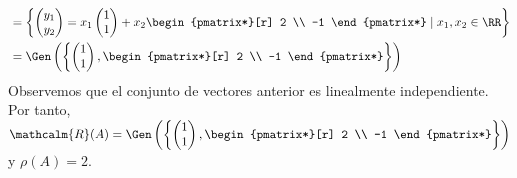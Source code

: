 \begin{examplebox}{}{}
\begin{align*}
        & = \left\{ \begin{pmatrix}
            y_1 \\
            y_2
        \end{pmatrix} = x_1 \begin{pmatrix}
            1 \\
            1
        \end{pmatrix} + x_2 \begin{pmatrix*}[r]
            2 \\
            -1
        \end{pmatrix*} \mid x_1, x_2 \in \RR \right\} \\
        & = \Gen \left(\left\{ \begin{pmatrix}
            1 \\
            1
        \end{pmatrix}, \begin{pmatrix*}[r]
            2 \\
            -1
        \end{pmatrix*} \right\}\right)
    \end{align*}
    Observemos que el conjunto de vectores anterior es linealmente independiente. Por tanto, $\mathcalm{R}(A) = \Gen \left(\left\{ \begin{pmatrix}
        1 \\
        1
    \end{pmatrix}, \begin{pmatrix*}[r]
        2 \\
        -1
    \end{pmatrix*} \right\}\right)$ y $\rho(A) = 2$.
\end{examplebox}

